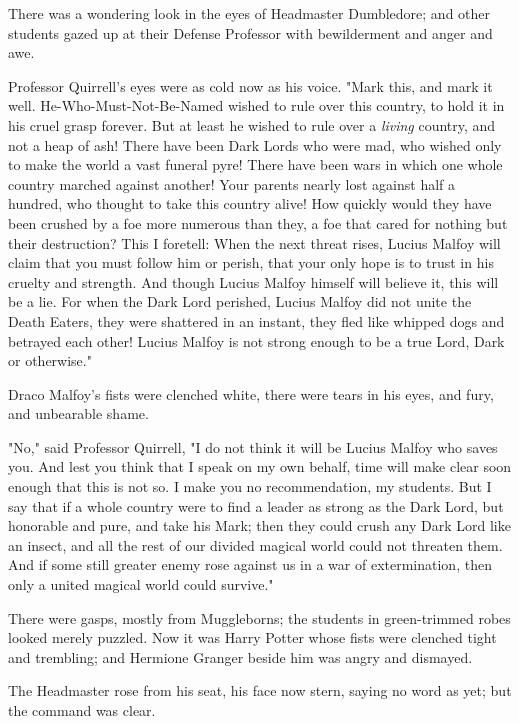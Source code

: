 There was a wondering look in the eyes of Headmaster Dumbledore; and other 
students gazed up at their Defense Professor with bewilderment and anger and 
awe.

Professor Quirrell's eyes were as cold now as his voice. "Mark this, and mark 
it well. He-Who-Must-Not-Be-Named wished to rule over this country, to hold it 
in his cruel grasp forever. But at least he wished to rule over a \emph{living} 
country, and not a heap of ash! There have been Dark Lords who were mad, who 
wished only to make the world a vast funeral pyre! There have been wars in 
which one whole country marched against another! Your parents nearly lost 
against half a hundred, who thought to take this country alive! How quickly 
would they have been crushed by a foe more numerous than they, a foe that cared 
for nothing but their destruction? This I foretell: When the next threat rises, 
Lucius Malfoy will claim that you must follow him or perish, that your only 
hope is to trust in his cruelty and strength. And though Lucius Malfoy himself 
will believe it, this will be a lie. For when the Dark Lord perished, Lucius 
Malfoy did not unite the Death Eaters, they were shattered in an instant, they 
fled like whipped dogs and betrayed each other! Lucius Malfoy is not strong 
enough to be a true Lord, Dark or otherwise."

Draco Malfoy's fists were clenched white, there were tears in his eyes, and 
fury, and unbearable shame.

"No," said Professor Quirrell, "I do not think it will be Lucius Malfoy who 
saves you. And lest you think that I speak on my own behalf, time will make 
clear soon enough that this is not so. I make you no recommendation, my 
students. But I say that if a whole country were to find a leader as strong as 
the Dark Lord, but honorable and pure, and take his Mark; then they could crush 
any Dark Lord like an insect, and all the rest of our divided magical world 
could not threaten them. And if some still greater enemy rose against us in a 
war of extermination, then only a united magical world could survive."

There were gasps, mostly from Muggleborns; the students in green-trimmed robes 
looked merely puzzled. Now it was Harry Potter whose fists were clenched tight 
and trembling; and Hermione Granger beside him was angry and dismayed.

The Headmaster rose from his seat, his face now stern, saying no word as yet; 
but the command was clear.

